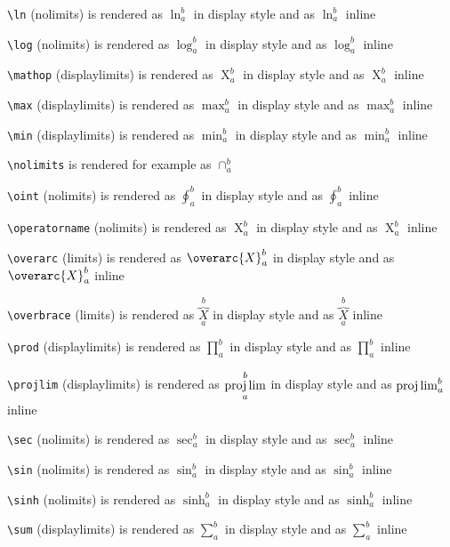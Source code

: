 \texttt{\textbackslash ln} (nolimits) is rendered as $\displaystyle \ln_a^b$ in display style and as $\ln_a^b$ inline

\texttt{\textbackslash log} (nolimits) is rendered as $\displaystyle \log_a^b$ in display style and as $\log_a^b$ inline

\texttt{\textbackslash mathop} (displaylimits) is rendered as $\displaystyle \mathop{X}_a^b$ in display style and as $\mathop{X}_a^b$ inline

\texttt{\textbackslash max} (displaylimits) is rendered as $\displaystyle \max_a^b$ in display style and as $\max_a^b$ inline

\texttt{\textbackslash min} (displaylimits) is rendered as $\displaystyle \min_a^b$ in display style and as $\min_a^b$ inline

\texttt{\textbackslash nolimits} is rendered for example as $\mathop\cap\nolimits_a^b$

\texttt{\textbackslash oint} (nolimits) is rendered as $\displaystyle \oint_a^b$ in display style and as $\oint_a^b$ inline

\texttt{\textbackslash operatorname} (nolimits) is rendered as $\displaystyle \operatorname{X}_a^b$ in display style and as $\operatorname{X}_a^b$ inline

\texttt{\textbackslash overarc} (limits) is rendered as $\displaystyle \overarc{X}_a^b$ in display style and as $\overarc{X}_a^b$ inline

\texttt{\textbackslash overbrace} (limits) is rendered as $\displaystyle \overbrace{X}_a^b$ in display style and as $\overbrace{X}_a^b$ inline

\texttt{\textbackslash prod} (displaylimits) is rendered as $\displaystyle \prod_a^b$ in display style and as $\prod_a^b$ inline

\texttt{\textbackslash projlim} (displaylimits) is rendered as $\displaystyle \projlim_a^b$ in display style and as $\projlim_a^b$ inline

\texttt{\textbackslash sec} (nolimits) is rendered as $\displaystyle \sec_a^b$ in display style and as $\sec_a^b$ inline

\texttt{\textbackslash sin} (nolimits) is rendered as $\displaystyle \sin_a^b$ in display style and as $\sin_a^b$ inline

\texttt{\textbackslash sinh} (nolimits) is rendered as $\displaystyle \sinh_a^b$ in display style and as $\sinh_a^b$ inline

\texttt{\textbackslash sum} (displaylimits) is rendered as $\displaystyle \sum_a^b$ in display style and as $\sum_a^b$ inline

